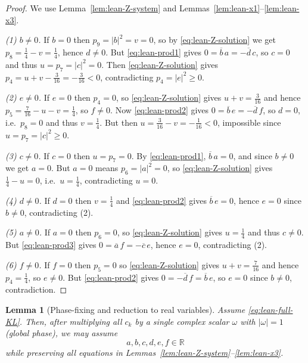 \documentclass[11pt]{article}
\newtheorem{lemma}{Lemma}
\begin{document}
\begin{proof}
We use Lemma~\ref{lem:lean-Z-system} and Lemmas~\ref{lem:lean-x1}--\ref{lem:lean-x3}.

\emph{(1) $b\neq 0$.}
If $b=0$ then $p_9=|b|^2=v=0$, so by \eqref{eq:lean-Z-solution} we get $p_8=\frac14-v=\frac14$, hence $d\neq 0$.
But \eqref{eq:lean-prod1} gives $0=\overline b\,a=-\overline d\,c$, so $c=0$ and thus $u=p_7=|c|^2=0$.
Then \eqref{eq:lean-Z-solution} gives $p_4=u+v-\frac{3}{16}=-\frac{3}{16}<0$, contradicting $p_4=|e|^2\ge 0$.

\emph{(2) $e\neq 0$.}
If $e=0$ then $p_4=0$, so \eqref{eq:lean-Z-solution} gives $u+v=\frac{3}{16}$ and hence
$p_5=\frac{7}{16}-u-v=\frac14$, so $f\neq 0$.
Now \eqref{eq:lean-prod2} gives $0=\overline b\,e=-\overline d\,f$, so $d=0$, i.e.\ $p_8=0$ and thus $v=\frac14$.
But then $u=\frac{3}{16}-v=-\frac{1}{16}<0$, impossible since $u=p_7=|c|^2\ge 0$.

\emph{(3) $c\neq 0$.}
If $c=0$ then $u=p_7=0$. By \eqref{eq:lean-prod1}, $\overline b\,a=0$, and since $b\neq 0$ we get $a=0$.
But $a=0$ means $p_6=|a|^2=0$, so \eqref{eq:lean-Z-solution} gives $\frac14-u=0$, i.e.\ $u=\frac14$, contradicting $u=0$.

\emph{(4) $d\neq 0$.}
If $d=0$ then $v=\frac14$ and \eqref{eq:lean-prod2} gives $\overline b\,e=0$, hence $e=0$ since $b\neq 0$,
contradicting (2).

\emph{(5) $a\neq 0$.}
If $a=0$ then $p_6=0$, so \eqref{eq:lean-Z-solution} gives $u=\frac14$ and thus $c\neq 0$.
But \eqref{eq:lean-prod3} gives $0=\overline a\,f=-\overline c\,e$, hence $e=0$, contradicting (2).

\emph{(6) $f\neq 0$.}
If $f=0$ then $p_5=0$ so \eqref{eq:lean-Z-solution} gives $u+v=\frac{7}{16}$ and hence $p_4=\frac14$, so $e\neq 0$.
But \eqref{eq:lean-prod2} gives $0=-\overline d\,f=\overline b\,e$, so $e=0$ since $b\neq 0$, contradiction.
\end{proof}

\begin{lemma}[Phase-fixing and reduction to real variables]
\label{lem:lean-phase-fix}
Assume \eqref{eq:lean-full-KL}. Then, after multiplying all $c_k$ by a single complex scalar $\omega$ with $|\omega|=1$
(global phase), we may assume
\[
a,b,c,d,e,f\in\mathbb R
\]
while preserving all equations in Lemmas~\ref{lem:lean-Z-system}--\ref{lem:lean-x3}.
\end{lemma}
\end{document}

